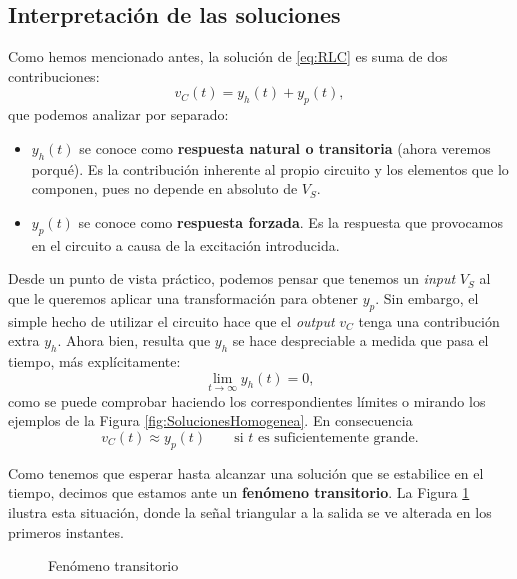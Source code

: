 \subsection{Interpretación  de las soluciones}
Como hemos mencionado antes, la solución de \eqref{eq:RLC} es suma de dos contribuciones:
\[
v_C(t) = y_h(t) + y_p(t),
\]
que podemos analizar por separado:
\begin{itemize}
  \item $y_h(t)$ se conoce como \textbf{respuesta natural o transitoria} (ahora veremos porqué). Es la contribución inherente al propio circuito y los elementos que lo componen, pues no depende en absoluto de $V_S$.
  \item $y_p(t)$ se conoce como \textbf{respuesta forzada}. Es la respuesta que provocamos en el circuito a causa de la excitación introducida.
\end{itemize}
Desde un punto de vista práctico, podemos pensar que tenemos un \textit{input} $V_S$ al que le queremos aplicar una transformación para obtener $y_p$. Sin embargo, el simple hecho de utilizar el circuito hace que el \textit{output} $v_C$ tenga una contribución extra $y_h$. Ahora bien, resulta que $y_h$ se hace despreciable a medida que pasa el tiempo, más explícitamente:
\[
\lim _{t\rightarrow \infty} y_h (t) = 0,
\]
como se puede comprobar haciendo los correspondientes límites o mirando los ejemplos de la Figura \ref{fig:SolucionesHomogenea}. En consecuencia
\begin{equation}
  \label{eq:aproximacionSolucionRLC}
  v_C(t) \approx y_p(t)\qquad \text{si }t \text{ es suficientemente grande}.
\end{equation}

Como tenemos que esperar hasta alcanzar una solución que se estabilice en el tiempo, decimos que estamos ante un  \textbf{fenómeno transitorio}. La Figura \ref{fig:Transitorio} ilustra esta situación, donde la señal triangular a la salida se ve alterada en los primeros instantes.

\begin{figure}
\begin{figurebox}
    \vspace{0pt}
    \centering
    \scalebox{0.4}{ }
    \vspace{-10pt}
    \caption{Fenómeno transitorio}
    \label{fig:Transitorio}
\end{figurebox}
\end{figure}





